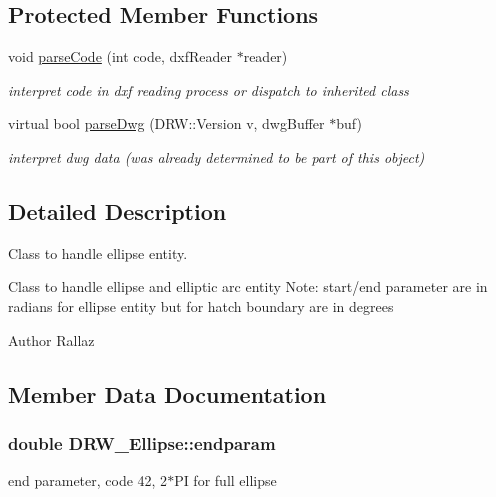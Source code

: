 \subsection*{Protected Member Functions}
\begin{DoxyCompactItemize}
\item 
\hypertarget{class_d_r_w___ellipse_a7e271b176d81110b92931514bddb2e6d}{}void \hyperlink{class_d_r_w___ellipse_a7e271b176d81110b92931514bddb2e6d}{parse\+Code} (int code, dxf\+Reader $\ast$reader)\label{class_d_r_w___ellipse_a7e271b176d81110b92931514bddb2e6d}

\begin{DoxyCompactList}\small\item\em interpret code in dxf reading process or dispatch to inherited class \end{DoxyCompactList}\item 
\hypertarget{class_d_r_w___ellipse_aa8871bb334eb53eb669eae505a4ae9fd}{}virtual bool \hyperlink{class_d_r_w___ellipse_aa8871bb334eb53eb669eae505a4ae9fd}{parse\+Dwg} (D\+R\+W\+::\+Version v, dwg\+Buffer $\ast$buf)\label{class_d_r_w___ellipse_aa8871bb334eb53eb669eae505a4ae9fd}

\begin{DoxyCompactList}\small\item\em interpret dwg data (was already determined to be part of this object) \end{DoxyCompactList}\end{DoxyCompactItemize}


\subsection{Detailed Description}
Class to handle ellipse entity. 

Class to handle ellipse and elliptic arc entity Note\+: start/end parameter are in radians for ellipse entity but for hatch boundary are in degrees \begin{DoxyAuthor}{Author}
Rallaz 
\end{DoxyAuthor}


\subsection{Member Data Documentation}
\hypertarget{class_d_r_w___ellipse_a69490d7e26d7c8fa602ef4a540b22d52}{}
\subsubsection[{endparam}]{\setlength{\rightskip}{0pt plus 5cm}double D\+R\+W\+\_\+\+Ellipse\+::endparam}\label{class_d_r_w___ellipse_a69490d7e26d7c8fa602ef4a540b22d52}
end parameter, code 42, 2$\ast$\+P\+I for full ellipse \hypertarget{class_d_r_w___ellipse_a6a8cd9de5c300fde3c52c26daf66ac77}{}
